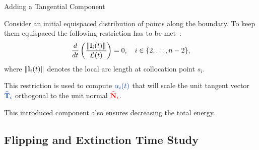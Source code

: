 \documentclass[usenames,dvipsnames]{beamer}
\begin{document}
\begin{frame}{Adding a Tangential Component}
    \begin{minipage}[t]{0.55\textwidth}
    Consider an initial equispaced distribution of points along the boundary. To keep them equispaced the following restriction has to be met~\cite{Mikula2001, Barrett2007, Barrett2010}:
    \begin{equation*}
        \dfrac{d}{dt}\left(\dfrac{\left\lVert\mathbf{l}_i(t)\right\rVert}{\mathcal{L}(t)}\right)=0, \quad i\in \{2,\dots,n-2\},
    \end{equation*}
    where $\left\lVert\mathbf{l}_i(t)\right\rVert$ denotes the local arc length at collocation point $s_i$.

    This restriction is used to compute $\color{bb} \alpha_i(t)$ that will scale the unit tangent vector $\color{bb} \hatT_i$ orthogonal to the unit normal $\color{red}\widehat{\mathbf{N}}_i$.

    This introduced component also ensures decreasing the total energy.
    \end{minipage}%
    \begin{minipage}[t]{0.5\textwidth}
    \centering
\begin{figure}
\end{figure}
    \end{minipage}%
\end{frame}


\subsection{Flipping and Extinction Time Study}
\end{document}
